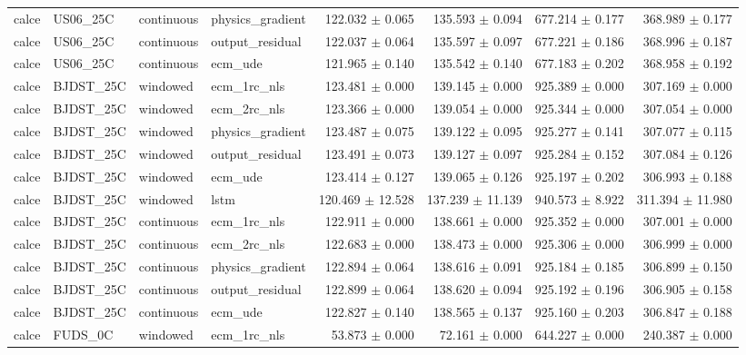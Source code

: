 \begin{longtable}{llllrrrr}
calce & US06\_25C & continuous & physics\_gradient & 122.032 $\pm$ 0.065 & 135.593 $\pm$ 0.094 & 677.214 $\pm$ 0.177 & 368.989 $\pm$ 0.177 \\
calce & US06\_25C & continuous & output\_residual & 122.037 $\pm$ 0.064 & 135.597 $\pm$ 0.097 & 677.221 $\pm$ 0.186 & 368.996 $\pm$ 0.187 \\
calce & US06\_25C & continuous & ecm\_ude & 121.965 $\pm$ 0.140 & 135.542 $\pm$ 0.140 & 677.183 $\pm$ 0.202 & 368.958 $\pm$ 0.192 \\
calce & BJDST\_25C & windowed & ecm\_1rc\_nls & 123.481 $\pm$ 0.000 & 139.145 $\pm$ 0.000 & 925.389 $\pm$ 0.000 & 307.169 $\pm$ 0.000 \\
calce & BJDST\_25C & windowed & ecm\_2rc\_nls & 123.366 $\pm$ 0.000 & 139.054 $\pm$ 0.000 & 925.344 $\pm$ 0.000 & 307.054 $\pm$ 0.000 \\
calce & BJDST\_25C & windowed & physics\_gradient & 123.487 $\pm$ 0.075 & 139.122 $\pm$ 0.095 & 925.277 $\pm$ 0.141 & 307.077 $\pm$ 0.115 \\
calce & BJDST\_25C & windowed & output\_residual & 123.491 $\pm$ 0.073 & 139.127 $\pm$ 0.097 & 925.284 $\pm$ 0.152 & 307.084 $\pm$ 0.126 \\
calce & BJDST\_25C & windowed & ecm\_ude & 123.414 $\pm$ 0.127 & 139.065 $\pm$ 0.126 & 925.197 $\pm$ 0.202 & 306.993 $\pm$ 0.188 \\
calce & BJDST\_25C & windowed & lstm & 120.469 $\pm$ 12.528 & 137.239 $\pm$ 11.139 & 940.573 $\pm$ 8.922 & 311.394 $\pm$ 11.980 \\
calce & BJDST\_25C & continuous & ecm\_1rc\_nls & 122.911 $\pm$ 0.000 & 138.661 $\pm$ 0.000 & 925.352 $\pm$ 0.000 & 307.001 $\pm$ 0.000 \\
calce & BJDST\_25C & continuous & ecm\_2rc\_nls & 122.683 $\pm$ 0.000 & 138.473 $\pm$ 0.000 & 925.306 $\pm$ 0.000 & 306.999 $\pm$ 0.000 \\
calce & BJDST\_25C & continuous & physics\_gradient & 122.894 $\pm$ 0.064 & 138.616 $\pm$ 0.091 & 925.184 $\pm$ 0.185 & 306.899 $\pm$ 0.150 \\
calce & BJDST\_25C & continuous & output\_residual & 122.899 $\pm$ 0.064 & 138.620 $\pm$ 0.094 & 925.192 $\pm$ 0.196 & 306.905 $\pm$ 0.158 \\
calce & BJDST\_25C & continuous & ecm\_ude & 122.827 $\pm$ 0.140 & 138.565 $\pm$ 0.137 & 925.160 $\pm$ 0.203 & 306.847 $\pm$ 0.188 \\
calce & FUDS\_0C & windowed & ecm\_1rc\_nls & 53.873 $\pm$ 0.000 & 72.161 $\pm$ 0.000 & 644.227 $\pm$ 0.000 & 240.387 $\pm$ 0.000 \\

\end{longtable}
